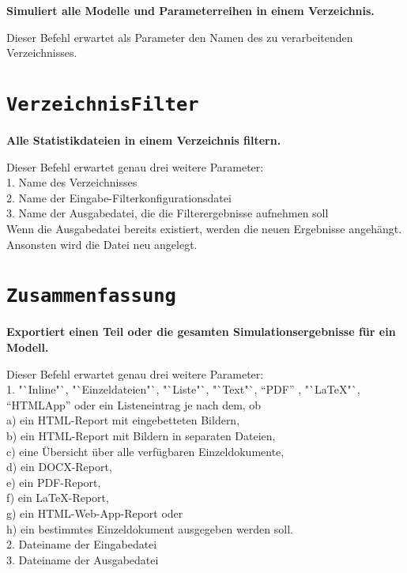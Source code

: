 \textbf{Simuliert alle Modelle und Parameterreihen in einem Verzeichnis.}

Dieser Befehl erwartet als Parameter den Namen des zu verarbeitenden Verzeichnisses.

\section{\texttt{VerzeichnisFilter}}

\textbf{Alle Statistikdateien in einem Verzeichnis filtern.}

Dieser Befehl erwartet genau drei weitere Parameter:\\
1. Name des Verzeichnisses\\
2. Name der Eingabe-Filterkonfigurationsdatei\\
3. Name der Ausgabedatei, die die Filterergebnisse aufnehmen soll\\
Wenn die Ausgabedatei bereits existiert, werden die neuen Ergebnisse angehängt.\\
Ansonsten wird die Datei neu angelegt.

\section{\texttt{Zusammenfassung}}

\textbf{Exportiert einen Teil oder die gesamten Simulationsergebnisse für ein Modell.}

Dieser Befehl erwartet genau drei weitere Parameter:\\
1. "`Inline"`, "`Einzeldateien"`, "`Liste"`, "`Text"`, "`PDF"' , "`LaTeX"`, "`HTMLApp"' oder ein Listeneintrag je nach dem, ob\\
a) ein HTML-Report mit eingebetteten Bildern,\\
b) ein HTML-Report mit Bildern in separaten Dateien,\\
c) eine Übersicht über alle verfügbaren Einzeldokumente,\\
d) ein DOCX-Report,\\
e) ein PDF-Report,\\
f) ein LaTeX-Report,\\
g) ein HTML-Web-App-Report oder\\
h) ein bestimmtes Einzeldokument ausgegeben werden soll.\\
2. Dateiname der Eingabedatei\\
3. Dateiname der Ausgabedatei

